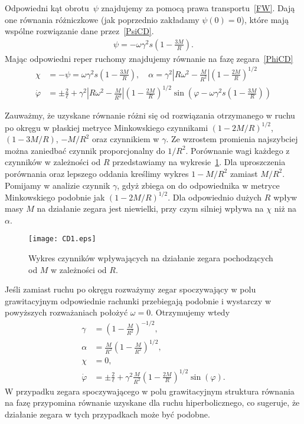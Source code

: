 Odpowiedni kąt obrotu~$\psi$ znajdujemy za pomocą prawa transportu~\eqref{FW}.
Dają one równania różniczkowe (jak poprzednio zakładamy $\psi(0)=0$), 
które mają wspólne rozwiązanie dane przez~\eqref{PsiCD}.
\begin{align}\label{PsiCD}
\psi = - \omega \gamma^2 s \left( 1-\frac{3M}{R} \right).
\end{align}
Mając odpowiedni reper ruchomy znajdujemy równanie na 
fazę zegara~\eqref{PhiCD}
\begin{align}\nonumber
\chi &= - \psi =\omega \gamma^2 s \left( 1-\frac{3M}{R} \right)
 , \quad 
\alpha =  \gamma^2 
\left| R\omega^2 - \frac{M}{R^2} \right|
\left( 1-\frac{2M}{R} \right)^{1/2}
\\
\dot{\varphi} &= \pm \frac{2}{\ell} + \label{PsiCD}
\gamma^2 
\left| R\omega^2 - \frac{M}{R^2} \right|
\left( 1-\frac{2M}{R} \right)^{1/2}
\sin \left(\varphi - 
\omega \gamma^2 s \left( 1-\frac{3M}{R} \right)
 \right)
\end{align}


Zauważmy, że uzyskane równanie różni się od rozwiązania 
otrzymanego w ruchu po okręgu w 
płaskiej metryce Minkowskiego czynnikami
$\left( 1-2M/R \right)^{1/2}$,
$ \left( 1-3M/R \right)$, $-M/R^2$ oraz czynnikiem w $\gamma$. 
Ze wzrostem promienia najszybciej można zaniedbać czynnik 
proporcjonalny do $1/R^2$. 
Porównanie wagi każdego z czynników
w zależności od $R$ 
przedstawiamy na wykresie~\ref{CD1plot}.
Dla uproszczenia porównania oraz lepszego oddania kreślimy 
wykres $1-M/R^2$ zamiast $M/R^2$. Pomijamy w analizie 
czynnik $\gamma$,
 gdyż zbiega on do odpowiednika w metryce Minkowskiego
podobnie jak $\left( 1-2M/R \right)^{1/2}$.
Dla odpowiednio dużych $R$ wpływ masy $M$ na działanie zegara jest niewielki, 
przy czym silniej wpływa na $\chi$ niż na $\alpha$.  
\begin{figure}
\centering
\texttt{[image: CD1.eps]}
\caption{Wykres czynników wpływających na działanie zegara 
pochodzących od $M$ w zależności od $R$.}{\label{CD1plot}}
\end{figure}

Jeśli zamiast ruchu po okręgu rozważymy zegar spoczywający w 
polu grawitacyjnym odpowiednie rachunki przebiegają podobnie i 
wystarczy w powyższych rozważaniach położyć $\omega=0$.
Otrzymujemy wtedy 
\begin{align*}
\gamma &= \left( 1 - \frac{M}{R^2} \right)^{-1/2},\\
\alpha &= \frac{M}{R^2} \left( 1 - \frac{M}{R^2} \right)^{1/2},\\
\chi &= 0,\\
\dot{\varphi} &= \pm \frac{2}{\ell} +
\gamma^2  \frac{M}{R^2} 
\left( 1-\frac{2M}{R} \right)^{1/2}
\sin \left(\varphi  \right).
\end{align*}
W przypadku zegara spoczywającego w polu grawitacyjnym 
struktura równania na fazę przypomina równanie uzyskane 
dla ruchu hiperbolicznego, co sugeruje, że działanie 
zegara w tych przypadkach może być podobne.  
